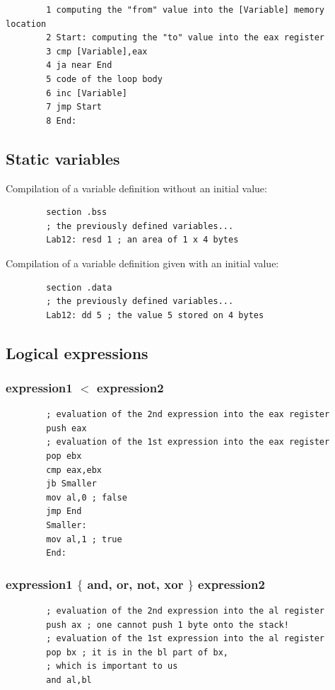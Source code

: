 \documentclass[margin=0px]{article}
\begin{document}
\begin{verbatim}
		1 computing the "from" value into the [Variable] memory location
		2 Start: computing the "to" value into the eax register
		3 cmp [Variable],eax
		4 ja near End
		5 code of the loop body
		6 inc [Variable]
		7 jmp Start
		8 End:
	\end{verbatim}

\subsection{Static variables}

Compilation of a variable definition without an initial value:
\begin{verbatim}
		section .bss
		; the previously defined variables...
		Lab12: resd 1 ; an area of 1 x 4 bytes
	\end{verbatim}


Compilation of a variable definition given with an initial value:
\begin{verbatim}
		section .data
		; the previously defined variables...
		Lab12: dd 5 ; the value 5 stored on 4 bytes
	\end{verbatim}

\subsection{Logical expressions}

\subsubsection{expression1 $ < $  expression2 }

\begin{verbatim}
		; evaluation of the 2nd expression into the eax register
		push eax
		; evaluation of the 1st expression into the eax register
		pop ebx
		cmp eax,ebx
		jb Smaller
		mov al,0 ; false
		jmp End
		Smaller:
		mov al,1 ; true
		End:
	\end{verbatim}

\subsubsection{expression1 $ \lbrace $ and, or, not, xor  $ \rbrace $  expression2 }

\begin{verbatim}
		; evaluation of the 2nd expression into the al register
		push ax ; one cannot push 1 byte onto the stack!
		; evaluation of the 1st expression into the al register
		pop bx ; it is in the bl part of bx,
		; which is important to us
		and al,bl
	\end{verbatim}
\end{document}
